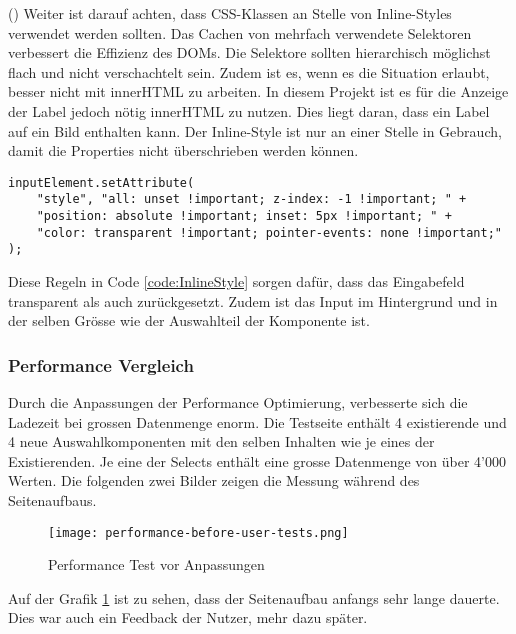 (\cite{efficientDomManipulation}) Weiter ist darauf achten, dass CSS-Klassen an Stelle von Inline-Styles verwendet werden sollten.
Das Cachen von mehrfach verwendete Selektoren verbessert die Effizienz des DOMs.
Die Selektore sollten hierarchisch möglichst flach und nicht verschachtelt sein.
Zudem ist es, wenn es die Situation erlaubt, besser nicht mit innerHTML zu arbeiten.
In diesem Projekt ist es für die Anzeige der Label jedoch nötig innerHTML zu nutzen.
Dies liegt daran, dass ein Label auf ein Bild enthalten kann.
Der Inline-Style ist nur an einer Stelle in Gebrauch, damit die Properties nicht überschrieben werden können.

\begin{lstlisting}[language = html5, caption = Inline-Style für Inputfeld, label = code:InlineStyle]
inputElement.setAttribute(
    "style", "all: unset !important; z-index: -1 !important; " +
    "position: absolute !important; inset: 5px !important; " +
    "color: transparent !important; pointer-events: none !important;"
);
\end{lstlisting}

Diese Regeln in Code \ref{code:InlineStyle} sorgen dafür, dass das Eingabefeld transparent als auch zurückgesetzt.
Zudem ist das Input im Hintergrund und in der selben Grösse wie der Auswahlteil der Komponente ist.

\subsubsection{Performance Vergleich}

Durch die Anpassungen der Performance Optimierung, verbesserte sich die Ladezeit bei grossen Datenmenge enorm.
Die Testseite enthält 4 existierende und 4 neue Auswahlkomponenten mit den selben Inhalten wie je eines der Existierenden.
Je eine der Selects enthält eine grosse Datenmenge von über 4'000 Werten.
Die folgenden zwei Bilder zeigen die Messung während des Seitenaufbaus.

\begin{figure}[!htb]
    \centering
    \texttt{[image: performance-before-user-tests.png]}
    \caption{Performance Test vor Anpassungen}
    \label{Abbildung:PerformanceTestBefore}
\end{figure}

Auf der Grafik \ref{Abbildung:PerformanceTestBefore} ist zu sehen, dass der Seitenaufbau anfangs sehr lange dauerte.
Dies war auch ein Feedback der Nutzer, mehr dazu später.

